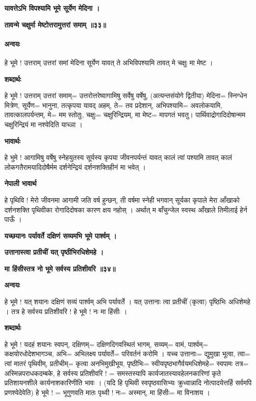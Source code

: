 \documentclass[11pt, a5paper]{article}
\begin{document}
\textbf{यावत्तेऽभि विपश्यामि भूमे सूर्येण मेदिना ।}

\textbf{तावन्मे चक्षुर्मा मेष्टोत्तरामुत्तरां समाम् ॥३३॥}

\paragraph{\textbf{अन्वयः}}

हे भूमे ! उत्तराम् उत्तरां समां मेदिना सूर्येण यावत् ते अभिविपश्यामि तावत् मे चक्षुः मा मेष्ट ।

\textbf{शब्दार्थः}

हे भूमे ! उत्तराम् उत्तरां समाम्= उत्तरोत्तरेष्वागामिषु सर्वेषु वर्षेषु, (अत्यन्तसंयोगे द्वितीया) मेदिना= स्निग्धेन मित्रेण, सूर्येण= भानुना, तत्कृपया यावद् अहम्, ते= तव प्रदेशान्, अभिपश्यामि= अवलोकयामि, तावत्कालपर्यन्तम्, मे= मम स्तोतुः, चक्षुः= चक्षुरिन्द्रियम्, मा मेष्ट= मापगतं भवतु। पार्थिवाद्रोगादिदोषान्मम चक्षुरिन्द्रियं मा नश्येदिति याच्ञा ।

\textbf{भावार्थः}

हे भुमे ! आगामिषु वर्षेषु स्नेहयुतस्य सूर्यस्य कृपया जीवनपर्यन्तं यावत् कालं त्वां पश्यामि तावत् कालं लोकगतैरामयादिदोषैर्मम दर्शनेन्द्रियं दर्शनशक्तिहीनं मा भवेत् ।

\textbf{नेपाली भावार्थ}

हे पृथिवि ! मेरो जीवनमा आगामी जति वर्ष हुन्छन्, ती वर्षमा स्नेही भगवान् सूर्यका कृपाले मेरा आँखाको दर्शनशक्ति पृथिवीका रोगादिदोषका कारण क्षय नहोस् । अर्थात् म बाँचुन्जेल स्वस्थ आँखाले तिमीलाई हेर्न पाऊँ ।

\textbf{यच्छयानः पर्यावर्ते दक्षिणं सव्यमभि भूमे पार्श्वम् ।}

\textbf{उत्तानास्त्वा प्रतीचीं यत् पृष्ठीभिरधिशेमहे ।}

\textbf{मा हिंसीस्तत्र नो भूमे सर्वस्य प्रतिशीवरि ॥३४॥}

\textbf{अन्वयः}

हे भूमे ! यत् शयानः दक्षिणं सव्यं पार्श्वम् अभि पर्यावर्ते । यत् उत्तानाः त्वा प्रतीचीं (कृत्वा) पृष्ठिभिः अधिशेमहे । तत्र हे सर्वस्य प्रतिशीवरि ! हे भूमे ! नः मा हिंसीः ।

\textbf{शब्दार्थः}

हे भूमे ! यदहं शयानः‍ स्वपन्, दक्षिणम्= दक्षिणदिगवस्थितं भागम्, सव्यम्= वामं, पार्श्वम्= कक्षयोरधोदेशभागञ्च, अभि= अभिलक्ष्य पर्यावर्ते= परिवर्तनं करोमि । यच्च उत्तानाः= द्युमुखा भूत्वा, त्वा= त्वां मातरं पृथिवीम्, प्रतीचीम्= कृत्वा अनभिमुखीभूय, पृष्ठीभिः= स्वीयपृष्ठभागैर्वयमधिशेमहे= स्वपामः तत्र= अस्मिन्नपराधकदम्बके, हे सर्वस्य प्रतिशीवरि ! = समस्तस्यापि कार्यजातस्यावहेलनकारिणां कृते प्रतिशायनशीले कार्यनाशकारिणीति भावः । (यदि हि पृथिवी स्वपृष्ठवासिभ्यः क्रुध्वान्नादि नोत्पादयेत्तर्हि सर्वमपि प्रणश्येदेवेति) हे भूमे ! = भूगुणवति मातः पृथ्वी ! नः= अस्मान्, मा हिंसीः= मा विनाशय ।
\end{document}
